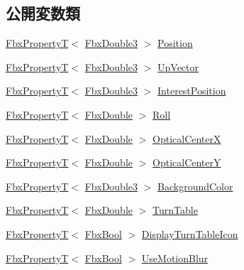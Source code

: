 \subsection*{公開変数類}
\begin{DoxyCompactItemize}
\item 
\hyperlink{class_fbx_property_t}{Fbx\+PropertyT}$<$ \hyperlink{fbxtypes_8h_ae0a96f14cde566774c7553aa7523b7a7}{Fbx\+Double3} $>$ \hyperlink{class_fbx_camera_afa38d19a4ebd6fac7ea040750fd1dae9}{Position}
\item 
\hyperlink{class_fbx_property_t}{Fbx\+PropertyT}$<$ \hyperlink{fbxtypes_8h_ae0a96f14cde566774c7553aa7523b7a7}{Fbx\+Double3} $>$ \hyperlink{class_fbx_camera_ad2e9b17c1be832d71d4fc0eecc93732a}{Up\+Vector}
\item 
\hyperlink{class_fbx_property_t}{Fbx\+PropertyT}$<$ \hyperlink{fbxtypes_8h_ae0a96f14cde566774c7553aa7523b7a7}{Fbx\+Double3} $>$ \hyperlink{class_fbx_camera_a686036fc4f1794fe7f3b74f978e8d174}{Interest\+Position}
\item 
\hyperlink{class_fbx_property_t}{Fbx\+PropertyT}$<$ \hyperlink{fbxtypes_8h_a171e72a1c46fc15c1a6c9c31948c1c5b}{Fbx\+Double} $>$ \hyperlink{class_fbx_camera_ab59a181ec24cb954e0899273caea96dc}{Roll}
\item 
\hyperlink{class_fbx_property_t}{Fbx\+PropertyT}$<$ \hyperlink{fbxtypes_8h_a171e72a1c46fc15c1a6c9c31948c1c5b}{Fbx\+Double} $>$ \hyperlink{class_fbx_camera_af1e8cb54a4d9a16471c6fd56d30cd128}{Optical\+CenterX}
\item 
\hyperlink{class_fbx_property_t}{Fbx\+PropertyT}$<$ \hyperlink{fbxtypes_8h_a171e72a1c46fc15c1a6c9c31948c1c5b}{Fbx\+Double} $>$ \hyperlink{class_fbx_camera_a8154f4f4e907c094df2decb36e179d85}{Optical\+CenterY}
\item 
\hyperlink{class_fbx_property_t}{Fbx\+PropertyT}$<$ \hyperlink{fbxtypes_8h_ae0a96f14cde566774c7553aa7523b7a7}{Fbx\+Double3} $>$ \hyperlink{class_fbx_camera_af50cc9dbfa39096cc1b9535e1b47d1d6}{Background\+Color}
\item 
\hyperlink{class_fbx_property_t}{Fbx\+PropertyT}$<$ \hyperlink{fbxtypes_8h_a171e72a1c46fc15c1a6c9c31948c1c5b}{Fbx\+Double} $>$ \hyperlink{class_fbx_camera_a927ab13d2fa91468ecb5373fdffd725a}{Turn\+Table}
\item 
\hyperlink{class_fbx_property_t}{Fbx\+PropertyT}$<$ \hyperlink{fbxtypes_8h_a92e0562b2fe33e76a242f498b362262e}{Fbx\+Bool} $>$ \hyperlink{class_fbx_camera_a935e9b57e229b7474770b0a0611a1b60}{Display\+Turn\+Table\+Icon}
\item 
\hyperlink{class_fbx_property_t}{Fbx\+PropertyT}$<$ \hyperlink{fbxtypes_8h_a92e0562b2fe33e76a242f498b362262e}{Fbx\+Bool} $>$ \hyperlink{class_fbx_camera_a73d5041546de951978b9065f7b0789a4}{Use\+Motion\+Blur}

\end{DoxyCompactItemize}
